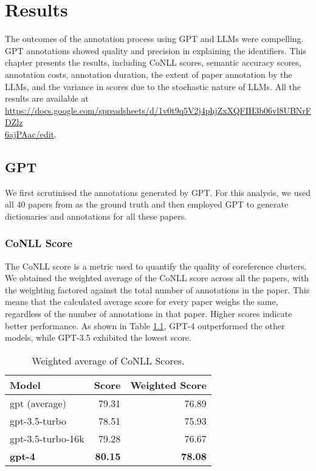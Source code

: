 \chapter{Results}\label{chapter:results}

The outcomes of the annotation process using GPT and LLMs were compelling. GPT annotations showed quality and precision in explaining the identifiers. This chapter presents the results, including CoNLL scores, semantic accuracy scores, annotation costs, annotation duration, the extent of paper annotation by the LLMs, and the variance in scores due to the stochastic nature of LLMs. All the results are available at \href{https://docs.google.com/spreadsheets/d/1v0t9q5V2j4phjZxXQFIH3b06vl8UBNrFDZlz6ajPAac/edit}{https://docs.google.com/spreadsheets/d/1v0t9q5V2j4phjZxXQFIH3b06vl8UBNrFDZlz} \\ \href{https://docs.google.com/spreadsheets/d/1v0t9q5V2j4phjZxXQFIH3b06vl8UBNrFDZlz6ajPAac/edit}{6ajPAac/edit}.

\section{GPT}
We first scrutinised the annotations generated by GPT. For this analysis, we used all 40 papers from \cite{asakura2022building} as the ground truth and then employed GPT to generate dictionaries and annotations for all these papers.

\subsection{CoNLL Score}
The CoNLL score is a metric used to quantify the quality of coreference clusters. We obtained the weighted average of the CoNLL score across all the papers, with the weighting factored against the total number of annotations in the paper. This means that the calculated average score for every paper weighs the same, regardless of the number of annotations in that paper. Higher scores indicate better performance. As shown in Table \ref{tab:conll-score}, GPT-4 outperformed the other models, while GPT-3.5 exhibited the lowest score.

\begin{table}[htpb]
  \centering
  \begin{tabular}{lrr}
    \hline
    Model & Score & Weighted Score \\
    \hline
    gpt (average) & 79.31 & 76.89 \\
    gpt-3.5-turbo & 78.51 & 75.93 \\
    gpt-3.5-turbo-16k & 79.28 & 76.67 \\
    \textbf{gpt-4} & \textbf{80.15} & \textbf{78.08}\\
    \hline
  \end{tabular}
  \caption[CoNLL Scores]{Weighted average of CoNLL Scores.}
  \label{tab:conll-score}
\end{table}


